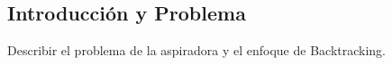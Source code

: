 \subsection{Introducción y Problema}

Describir el problema de la aspiradora y el enfoque de Backtracking.
